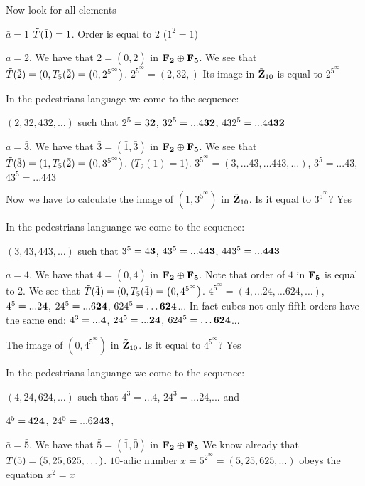 Now look for all elements

  $\bar a=1$  $\tilde T(\bar 1)=1$. Order is equal to $2$ ($1^2=1$)

\m


  $\bar a=\bar 2$. We have that   $\bar 2=(\bar 0,\bar 2)$ in $\bf F_2\oplus F_{5}$.
     We see that $\tilde T(\bar 2)=(0,T_5(\bar 2)=\left(0,2^{5^\infty}\right)$.
        $2^{5^\infty}=(2,32,)$
  Its image in $\tilde{{\bf Z}}_{10}$ is equal to $2^{5^\infty}$

In the pedestrians language we come to the sequence:

  $(2,32,432,\dots)$ such that  $2^5=3\bf 2$, $32^5=...4\bf 32$, $432^5=...4\bf 432$

\m



  $\bar a=\bar 3$. We have that   $\bar 3=(\bar 1,\bar 3)$ in $\bf F_2\oplus F_{5}$.
     We see that $\tilde T(\bar 3)=(1,T_5(\bar 2)=\left(0,3^{5^\infty}\right)$. ($T_2(1)=1$).
        $3^{5^\infty}=(3,\dots 43, \dots 443,\dots)$, $3^5=...43$, $43^5=...443$


  Now we have to calculate the image of $(1,3^{5^\infty})$  in $\tilde{{\bf Z}}_{10}$. Is it equal to $3^{5^\infty}$? Yes



In the pedestrians languange we come to the sequence:

  $(3,43,443,\dots)$ such that  $3^5=4\bf 3$, $43^5=...4\bf 43$, $443^5=...\bf 443$


\m

$\bar a=\bar 4$. We have that   $\bar 4=(\bar 0,\bar 4)$ in $\bf F_2\oplus F_{5}$.
Note that order of $\bar 4$ in $\bf F_5$ is equal to $2$.
     We see that $\tilde T(\bar 4)=(0,T_5(\bar 4)=\left(0,4^{5^\infty}\right)$.
        $4^{5^\infty}=(4,\dots 24, \dots624 ,\dots)$, $4^5=...2\bf 4$, $24^5=...6\bf 24$, $624^5=\dots \bf 624$...
In fact cubes not only fifth orders have the same end:
  $4^3=...\bf 4$, $24^5=...\bf 24$, $624^5=\dots \bf 624$...

The image of $(0,4^{5^\infty})$  in $\tilde{{\bf Z}}_{10}$. Is it equal to $4^{5^\infty}$? Yes

In the pedestrians languange we come to the sequence:

  $(4,24,624,\dots)$ such that
   $4^3=...4$, $24^3=...24$,... and

  $4^5=4\bf 24$, $24^5=...6\bf 243$,


  \m


    $\bar a=\bar 5$. We have that   $\bar 5=(\bar 1,\bar 0)$ in $\bf F_2\oplus F_{5}$
    We know already  that $\tilde T(5)=(5,25,625,\dots)$.
   $10$-adic number $x=5^{2^\infty}=(5,25,625,\dots)$
    obeys the equation $x^2=x$

